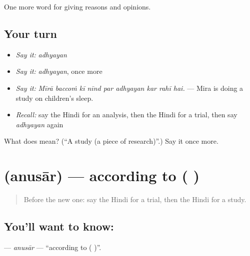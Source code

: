 \begin{grammarlens}[title={What you've built}]
One more word for giving reasons and opinions.
\end{grammarlens}

\subsection*{Your turn}
\begin{itemize}
\raggedright
  \item \emph{Say it:} \emph{adhyayan}
  \item \emph{Say it:} \emph{adhyayan}, once more
  \item \emph{Say it:} \emph{Mīrā baccoṁ kī nīnd par adhyayan kar rahī hai.} — Mira is doing a study on children's sleep.
  \item \emph{Recall:} say the Hindi for an analysis, then the Hindi for a trial, then say \emph{adhyayan} again
\end{itemize}

\begin{tcolorbox}[breakable,colback=teal!4,colframe=teal!35!black,title={Before you move on}]
What does  mean? (\textquotedblleft{}A study (a piece of research)\textquotedblright{}.) Say it once more.
\end{tcolorbox}
\section[\texorpdfstring{\hi{अनुसार} (anusār)}{अनुसार (anusār)}]{ (anusār) — according to ( )}

\label{lesson:HI-C363-anusar}



\begin{quote}
Before the new one: say the Hindi for a trial, then the Hindi for a study.
\end{quote}

\subsection*{You'll want to know: }
\textbf{} — \emph{anusār} — \textquotedblleft{}according to ( )\textquotedblright{}.

\begin{quote}
         
\end{quote}

